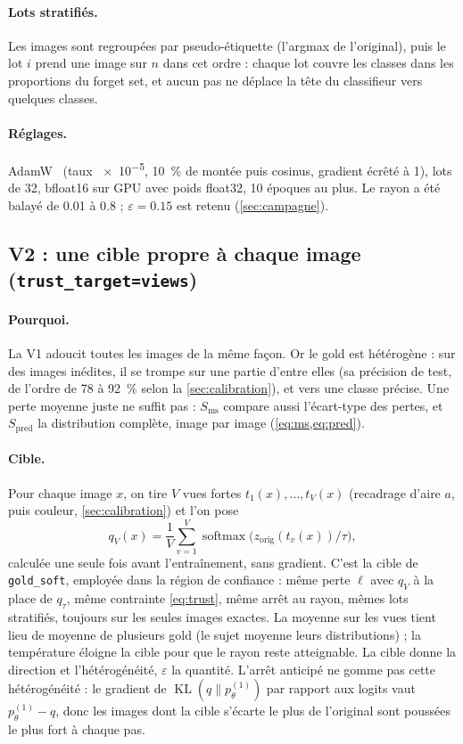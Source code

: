 \documentclass[11pt,a4paper]{article}
\newcommand{\KL}{\operatorname{KL}}
\newcommand{\orig}{\mathrm{orig}}
\newcommand{\code}[1]{\texttt{#1}}
\begin{document}
\paragraph{Lots stratifiés.} Les images sont regroupées par pseudo-étiquette (l'argmax de
l'original), puis le lot $i$ prend une image sur $n$ dans cet ordre : chaque lot couvre les classes
dans les proportions du forget set, et aucun pas ne déplace la tête du classifieur vers quelques
classes.

\paragraph{Réglages.} AdamW~\cite{loshchilov2019} (taux \num{e-5}, \SI{10}{\percent} de montée puis
cosinus, gradient écrêté à 1), lots de 32, bfloat16 sur GPU avec poids float32, 10 époques au plus.
Le rayon a été balayé de \num{0.01} à \num{0.8} ; $\varepsilon=\num{0.15}$ est retenu
(\cref{sec:campagne}).

\subsection{V2 : une cible propre à chaque image (\code{trust\_target=views})}\label{sec:trustv2}
\paragraph{Pourquoi.} La V1 adoucit toutes les images de la même façon. Or le gold est hétérogène :
sur des images inédites, il se trompe sur une partie d'entre elles (sa précision de test, de
l'ordre de 78 à \SI{92}{\percent} selon la \cref{sec:calibration}), et vers une classe précise. Une
perte moyenne juste ne suffit pas : $S_{\text{ms}}$ compare aussi l'écart-type des pertes, et
$S_{\text{pred}}$ la distribution complète, image par image (\cref{eq:ms,eq:pred}).

\paragraph{Cible.} Pour chaque image $x$, on tire $V$ vues fortes $t_1(x),\dots,t_V(x)$
(recadrage d'aire $a$, puis couleur, \cref{sec:calibration}) et l'on pose
\begin{equation}\label{eq:qviews}
  q_V(x)=\frac1V\sum_{v=1}^{V}\operatorname{softmax}\bigl(z_\orig(t_v(x))/\tau\bigr),
\end{equation}
calculée une seule fois avant l'entraînement, sans gradient. C'est la cible de \code{gold\_soft},
employée dans la région de confiance : même perte $\ell$ avec $q_V$ à la place de $q_\tau$, même
contrainte \eqref{eq:trust}, même arrêt au rayon, mêmes lots stratifiés, toujours sur les seules
images exactes. La moyenne sur les vues tient lieu de moyenne de plusieurs gold (le sujet moyenne
leurs distributions) ; la température éloigne la cible pour que le rayon reste atteignable. La
cible donne la direction et l'hétérogénéité, $\varepsilon$ la quantité. L'arrêt anticipé ne gomme
pas cette hétérogénéité : le gradient de $\KL(q\|p^{(1)}_\theta)$ par rapport aux logits vaut
$p^{(1)}_\theta-q$, donc les images dont la cible s'écarte le plus de l'original sont poussées le
plus fort à chaque pas.
\end{document}
